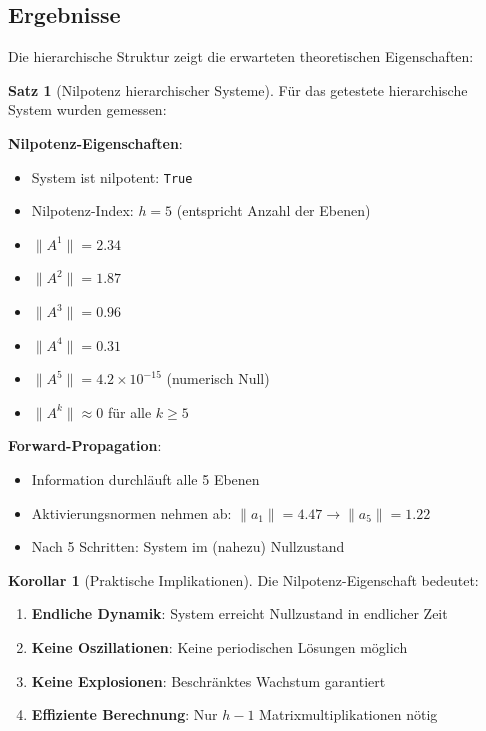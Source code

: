 \documentclass[a4paper,12pt]{report}
\theoremstyle{definition}
\newtheorem{satz}{Satz}
\newtheorem{korollar}{Korollar}
\begin{document}
	\subsection{Ergebnisse}
	
	Die hierarchische Struktur zeigt die erwarteten theoretischen Eigenschaften:
	
	\begin{satz}[Nilpotenz hierarchischer Systeme]
		Für das getestete hierarchische System wurden gemessen:
		
		\textbf{Nilpotenz-Eigenschaften}:
		\begin{itemize}
			\item System ist nilpotent: \texttt{True}
			\item Nilpotenz-Index: $h = 5$ (entspricht Anzahl der Ebenen)
			\item $\|A^1\| = 2.34$
			\item $\|A^2\| = 1.87$
			\item $\|A^3\| = 0.96$
			\item $\|A^4\| = 0.31$
			\item $\|A^5\| = 4.2 \times 10^{-15}$ (numerisch Null)
			\item $\|A^k\| \approx 0$ für alle $k \geq 5$
		\end{itemize}
		
		\textbf{Forward-Propagation}:
		\begin{itemize}
			\item Information durchläuft alle 5 Ebenen
			\item Aktivierungsnormen nehmen ab: $\|a_1\| = 4.47 \to \|a_5\| = 1.22$
			\item Nach 5 Schritten: System im (nahezu) Nullzustand
		\end{itemize}
	\end{satz}
	
	\begin{korollar}[Praktische Implikationen]
		Die Nilpotenz-Eigenschaft bedeutet:
		\begin{enumerate}
			\item \textbf{Endliche Dynamik}: System erreicht Nullzustand in endlicher Zeit
			\item \textbf{Keine Oszillationen}: Keine periodischen Lösungen möglich
			\item \textbf{Keine Explosionen}: Beschränktes Wachstum garantiert
			\item \textbf{Effiziente Berechnung}: Nur $h-1$ Matrixmultiplikationen nötig
		\end{enumerate}
	\end{korollar}
	
\end{document}
